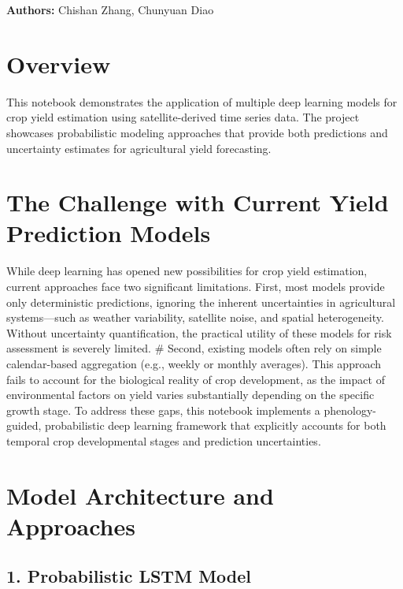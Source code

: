 \documentclass[
  letterpaper,
  DIV=11,
  numbers=noendperiod]{scrreprt}
\begin{document}
\textbf{Authors:} Chishan Zhang, Chunyuan Diao

\section{Overview}\label{overview}

This notebook demonstrates the application of multiple deep learning
models for crop yield estimation using satellite-derived time series
data. The project showcases probabilistic modeling approaches that
provide both predictions and uncertainty estimates for agricultural
yield forecasting.

\section{The Challenge with Current Yield Prediction
Models}\label{the-challenge-with-current-yield-prediction-models}

While deep learning has opened new possibilities for crop yield
estimation, current approaches face two significant limitations. First,
most models provide only deterministic predictions, ignoring the
inherent uncertainties in agricultural systems---such as weather
variability, satellite noise, and spatial heterogeneity. Without
uncertainty quantification, the practical utility of these models for
risk assessment is severely limited. \# Second, existing models often
rely on simple calendar-based aggregation (e.g., weekly or monthly
averages). This approach fails to account for the biological reality of
crop development, as the impact of environmental factors on yield varies
substantially depending on the specific growth stage. To address these
gaps, this notebook implements a phenology-guided, probabilistic deep
learning framework that explicitly accounts for both temporal crop
developmental stages and prediction uncertainties.

\section{Model Architecture and
Approaches}\label{model-architecture-and-approaches}

\subsection{1. Probabilistic LSTM Model}\label{probabilistic-lstm-model}
\end{document}
